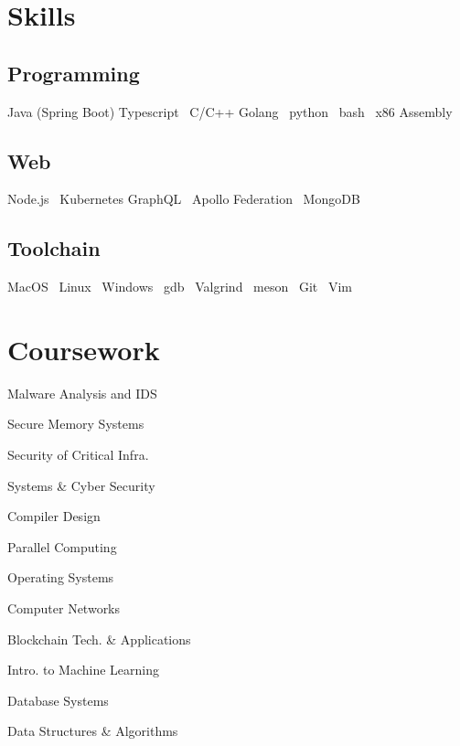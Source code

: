 \documentclass[a4paper]{deedy-resume-reversed}
\begin{document}
\begin{minipage}[t]{0.33\textwidth}

\section{Skills}
\subsection{Programming}
    Java (Spring Boot) \textbullet Typescript  \textbullet\ C/C++ \textbullet Golang \textbullet\
    python \textbullet\ bash \textbullet\ x86 Assembly
\sectionsep

\subsection{Web}
    Node.js \textbullet\ Kubernetes \textbullet{} GraphQL \textbullet\ Apollo Federation \textbullet\ MongoDB
\sectionsep

    \subsection{Toolchain}
    MacOS \textbullet\ Linux \textbullet\ Windows \textbullet\ gdb \textbullet\ Valgrind \textbullet\ meson \textbullet\ Git \textbullet\ Vim
\sectionsep


\section{Coursework}
\vspace{10pt} %
\begin{tightemize}
\item Malware Analysis and IDS
\item Secure Memory Systems
\item Security of Critical Infra.
\item Systems \& Cyber Security
\item Compiler Design
\item Parallel Computing
\item Operating Systems
\item Computer Networks
\item Blockchain Tech. \& Applications
\item Intro. to Machine Learning
\item Database Systems
\item Data Structures \& Algorithms
\end{tightemize}
\sectionsep


\end{minipage}
\end{document}
